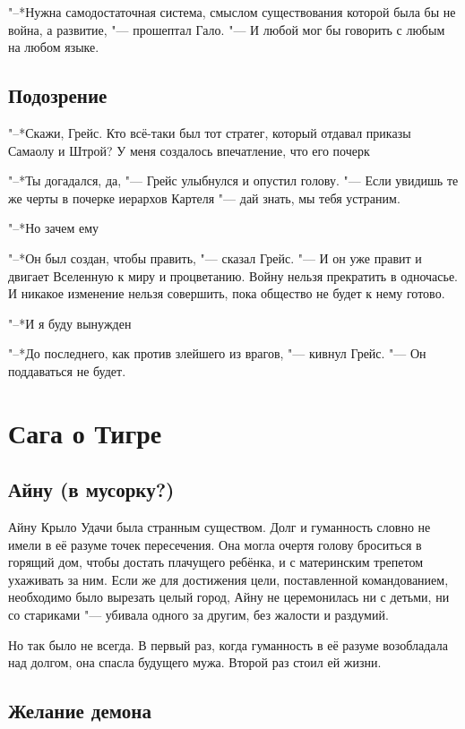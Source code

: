 \documentclass[a4paper,10pt]{book}
\newcommand{\ldotst}{\so{...}\xspace}
\newcommand{\ldotsq}{\so{?\hbox{\hspace{-.212em}}..}\xspace}
\begin{document}
"--*Нужна самодостаточная система, смыслом существования которой была бы не 
война, а развитие, "--- прошептал Гало. "--- И любой мог бы говорить с любым на 
любом языке.

\section{Подозрение}

"--*Скажи, Грейс. Кто всё-таки был тот стратег, который отдавал приказы Самаолу и Штрой? У меня создалось впечатление, что его почерк\ldotst

"--*Ты догадался, да, "--- Грейс улыбнулся и опустил голову. "--- Если увидишь те же черты в почерке иерархов Картеля "--- дай знать, мы тебя устраним.

"--*Но зачем ему\ldotsq

"--*Он был создан, чтобы править, "--- сказал Грейс. "--- И он уже правит и двигает Вселенную к миру и процветанию. Войну нельзя прекратить в одночасье. И никакое изменение нельзя совершить, пока общество не будет к нему готово.

"--*И я буду вынужден\ldotst

"--*До последнего, как против злейшего из врагов, "--- кивнул Грейс. "--- Он поддаваться не будет.

\chapter{Сага о Тигре}

\section{Айну (в мусорку?)}

Айну Крыло Удачи была странным существом.
Долг и гуманность словно не имели в её разуме точек пересечения.
Она могла очертя голову броситься в горящий дом, чтобы достать плачущего ребёнка, и с материнским трепетом ухаживать за ним. 
Если же для достижения цели, поставленной командованием, необходимо было вырезать целый город, Айну не церемонилась ни с детьми, ни со стариками "--- убивала одного за другим, без жалости и раздумий.

Но так было не всегда.
В первый раз, когда гуманность в её разуме возобладала над долгом, она спасла будущего мужа.
Второй раз стоил ей жизни.

\section{Желание демона}
\end{document}
